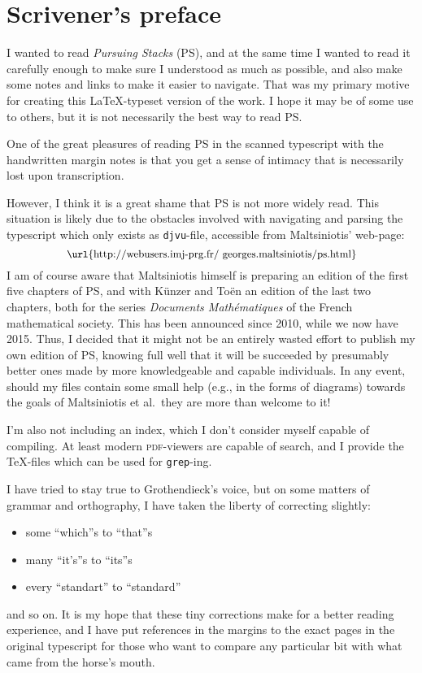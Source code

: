 
\chapter{Scrivener's preface}

I wanted to read \emph{Pursuing Stacks} (PS), and at the same time I
wanted to read it carefully enough to make sure I understood as much
as possible, and also make some notes and links to make
it easier to navigate. That was my primary motive for creating this
\LaTeX-typeset version of the work. I hope it may be of some use to
others, but it is not necessarily the best way to read PS.

One of the great pleasures of reading PS in the
scanned typescript with the handwritten margin notes is that you get a
sense of intimacy that is necessarily lost upon transcription.

However, I think it is a great shame that PS is not more widely read. This
situation is likely due to the obstacles involved with navigating and
parsing the typescript which only exists as \texttt{djvu}-file, accessible from
Maltsiniotis' web-page:
\[\text{\small\url{http://webusers.imj-prg.fr/~georges.maltsiniotis/ps.html}}\]
I am of course aware that Maltsiniotis himself is preparing an edition of the
first five chapters of PS, and with K\"unzer and To\"en an edition of
the last two chapters, both for the series \emph{Documents
  Math\'ematiques} of the French mathematical society. This has been
announced since 2010, while we now have 2015. Thus, I decided that it
might not be an entirely wasted effort to publish my own edition of
PS, knowing full well that it will be succeeded by presumably better
ones made by more knowledgeable and capable individuals. In any event,
should my files contain some small help (e.g., in the forms of diagrams)
towards the goals of Maltsiniotis et al.\ they are more than welcome
to it!

I'm also not including an index, which I don't consider myself capable of
compiling. At least modern \textsc{pdf}-viewers are capable of search,
and I provide the \TeX-files which can be used for \texttt{grep}-ing.

I have tried to stay true to Grothendieck's voice, but on some
matters of grammar and orthography, I have taken the liberty of
correcting slightly:
\begin{itemize}
\item some ``which''s to ``that''s
\item many ``it's''s to ``its''s
\item every ``standart'' to ``standard''
\end{itemize}
and so on. It is my hope that these tiny corrections make for a better
reading experience, and I have put references in the margins to the
exact pages in the original typescript for those who want to compare
any particular bit with what came from the horse's mouth.

